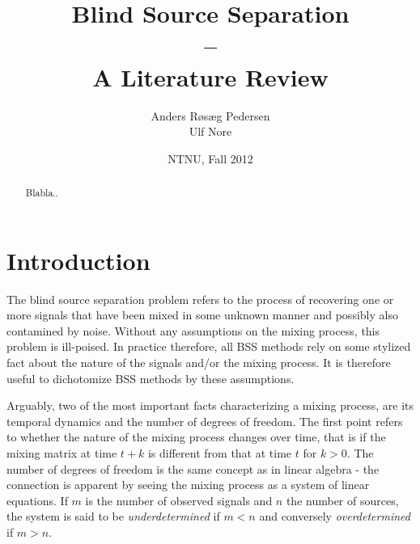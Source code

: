 \documentclass[11pt, oneside, a4paper]{article}
\begin{document}

\title{Blind Source Separation\\--\\A Literature Review}
\author{Anders Røsæg Pedersen\\Ulf Nore}
\date{NTNU, Fall 2012}    %
\maketitle

\begin{abstract}
Blabla..
\end{abstract}

\tableofcontents

\section{Introduction}

The blind source separation problem refers to the process of
recovering one or more signals that have been mixed in some unknown
manner and possibly also contamined by noise. Without any assumptions
on the mixing process, this problem is ill-poised. In practice
therefore, all BSS methods rely on some stylized fact about the nature
of the signals and/or the mixing process. It is therefore useful to
dichotomize BSS methods by these assumptions.


Arguably, two of the most important facts characterizing a mixing
process, are its temporal dynamics and the number of degrees of
freedom. The first point refers to whether the nature of the mixing
process changes over time, that is if the mixing matrix at time $t+k$
is different from that at time $t$ for $k>0$. The number of degrees of
freedom is the same concept as in linear algebra - the connection is
apparent by seeing the mixing process as a system of linear
equations. If $m$ is the number of observed signals and $n$ the number
of sources, the system is said to be \emph{underdetermined} if $m<n$
and conversely \emph{overdetermined} if $m>n$. 
\end{document}
